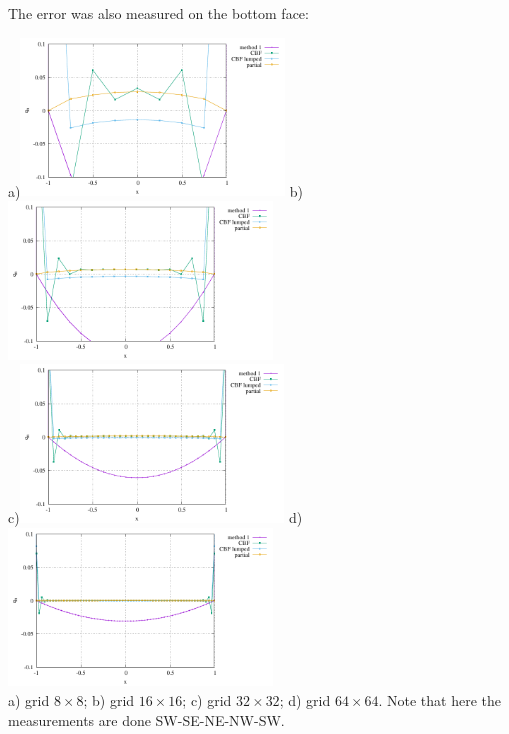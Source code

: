 The error was also measured on the bottom face:
\begin{center}
a)\includegraphics[width=7cm]{python_codes/fieldstone_173/results/exp2/8x8/heat_flux_boundary_bottom.pdf}
b)\includegraphics[width=7cm]{python_codes/fieldstone_173/results/exp2/16x16/heat_flux_boundary_bottom.pdf}\\
c)\includegraphics[width=7cm]{python_codes/fieldstone_173/results/exp2/32x32/heat_flux_boundary_bottom.pdf}
d)\includegraphics[width=7cm]{python_codes/fieldstone_173/results/exp2/64x64/heat_flux_boundary_bottom.pdf}\\
{\captionfont a) grid $8\times 8$; b) grid $16\times 16$;
c) grid $32\times 32$; d) grid $64\times 64$. 
Note that here the measurements are done SW-SE-NE-NW-SW.}
\end{center}

